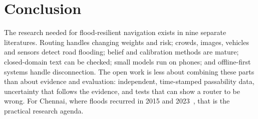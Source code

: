 \documentclass[journal]{IEEEtran}
\begin{document}
\section{Conclusion}
The research needed for flood-resilient navigation exists in nine separate literatures. Routing handles changing weights and risk; crowds, images, vehicles and sensors detect road flooding; belief and calibration methods are mature; closed-domain text can be checked; small models run on phones; and offline-first systems handle disconnection. The open work is less about combining these parts than about evidence and evaluation: independent, time-stamped passability data, uncertainty that follows the evidence, and tests that can show a router to be wrong. For Chennai, where floods recurred in 2015 and 2023~\cite{radhakrishnan2024chennai}, that is the practical research agenda.



\end{document}
